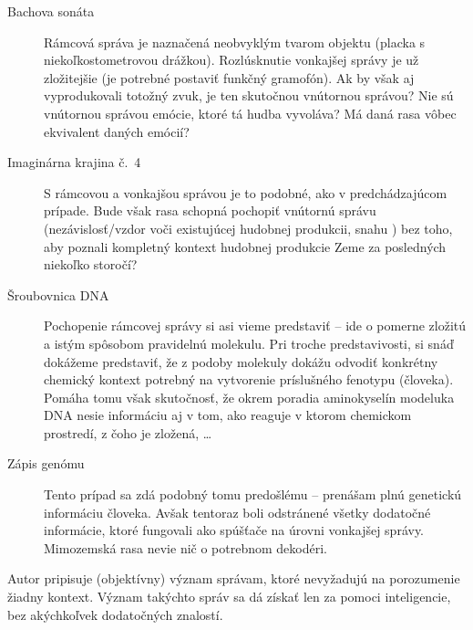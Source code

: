 \documentclass[12pt]{article}
\begin{document}
\begin{description}
\item[Bachova sonáta] Rámcová správa je naznačená neobvyklým tvarom objektu (placka s niekoľkostometrovou drážkou). Rozlúsknutie vonkajšej správy je už zložitejšie (je potrebné postaviť funkčný gramofón). Ak by však aj vyprodukovali totožný zvuk, je ten skutočnou vnútornou správou? Nie sú vnútornou správou emócie, ktoré tá hudba vyvoláva? Má daná rasa vôbec ekvivalent daných emócií?
\item[Imaginárna krajina č.\ 4] S rámcovou a vonkajšou správou je to podobné, ako v predchádzajúcom prípade. Bude však rasa schopná pochopiť vnútornú správu (nezávislosť/vzdor voči existujúcej hudobnej produkcii, snahu ) bez toho, aby poznali kompletný kontext hudobnej produkcie Zeme za posledných niekoľko storočí?
\item[Šroubovnica DNA] Pochopenie rámcovej správy si asi vieme predstaviť -- ide o pomerne zložitú a istým spôsobom  pravidelnú molekulu. Pri troche predstavivosti, si snáď dokážeme predstaviť, že z podoby molekuly dokážu odvodiť konkrétny chemický kontext potrebný na vytvorenie príslušného fenotypu (človeka). Pomáha tomu však skutočnosť, že okrem poradia aminokyselín modeluka DNA nesie informáciu aj v tom, ako reaguje v ktorom chemickom prostredí, z čoho je zložená, \dots
\item[Zápis genómu] Tento prípad sa zdá podobný tomu predošlému -- prenášam plnú genetickú informáciu človeka. Avšak tentoraz boli odstránené všetky dodatočné informácie, ktoré fungovali ako spúšťače na úrovni vonkajšej správy. Mimozemská rasa nevie nič o potrebnom dekodéri.
\end{description}

Autor pripisuje  (objektívny) význam správam, ktoré nevyžadujú na porozumenie žiadny kontext. Význam takýchto správ sa dá získať len za pomoci inteligencie, bez akýchkoľvek dodatočných znalostí.
\end{document}

